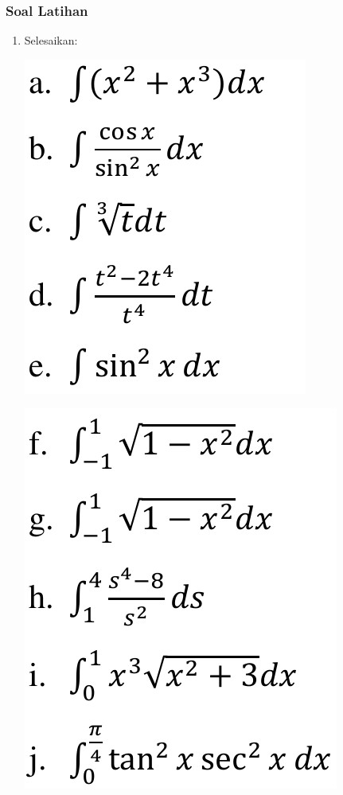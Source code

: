 \documentclass[pdflatex,compress,mathserif]{beamer}
\begin{document}
		\begin{frame}
			\frametitle{Soal Latihan}
			\begin{enumerate}
				\item Selesaikan:
				\begin{multicols}{2}
					\begin{center}
						\includegraphics[width=0.6\linewidth]{pict/36}
					\end{center}
					\columnbreak
					\begin{center}
						\includegraphics[width=0.6\linewidth]{pict/37}
					\end{center}
				\end{multicols}
			\end{enumerate}
		\end{frame}
	
\end{document}
